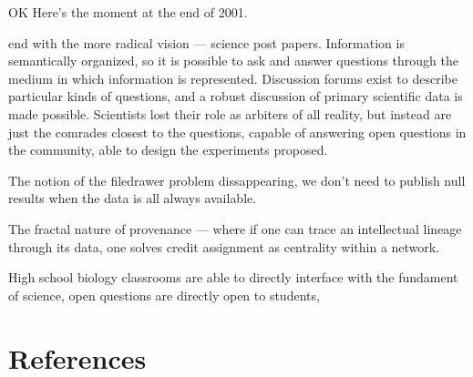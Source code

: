 \documentclass{article}
\begin{document}
OK Here's the moment at the end of 2001.

end with the more radical vision --- science post papers. Information is
semantically organized, so it is possible to ask and answer questions
through the medium in which information is represented. Discussion
forums exist to describe particular kinds of questions, and a robust
discussion of primary scientific data is made possible. Scientists lost
their role as arbiters of all reality, but instead are just the comrades
closest to the questions, capable of answering open questions in the
community, able to design the experiments proposed.

The notion of the filedrawer problem dissappearing, we don't need to
publish null results when the data is all always available.

The fractal nature of provenance --- where if one can trace an
intellectual lineage through its data, one solves credit assignment as
centrality within a network.

High school biology classrooms are able to directly interface with the
fundament of science, open questions are directly open to students,

\hypertarget{references}{%
\section{References}\label{references}}
\end{document}
